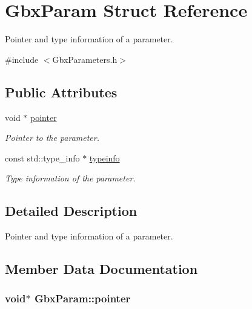 \hypertarget{structGbxParam}{\section{Gbx\-Param Struct Reference}
\label{structGbxParam}
}


Pointer and type information of a parameter.  




{\ttfamily \#include $<$Gbx\-Parameters.\-h$>$}

\subsection*{Public Attributes}
\begin{DoxyCompactItemize}
\item 
void $\ast$ \hyperlink{structGbxParam_a19b53f8dacdd8937e1020775f8615495}{pointer}
\begin{DoxyCompactList}\small\item\em Pointer to the parameter. \end{DoxyCompactList}\item 
const std\-::type\-\_\-info $\ast$ \hyperlink{structGbxParam_afb3596a5ba95fda1e27a5c6b4ed517b5}{typeinfo}
\begin{DoxyCompactList}\small\item\em Type information of the parameter. \end{DoxyCompactList}\end{DoxyCompactItemize}


\subsection{Detailed Description}
Pointer and type information of a parameter. 

\subsection{Member Data Documentation}
\hypertarget{structGbxParam_a19b53f8dacdd8937e1020775f8615495}{
\subsubsection[{pointer}]{\setlength{\rightskip}{0pt plus 5cm}void$\ast$ Gbx\-Param\-::pointer}}\label{structGbxParam_a19b53f8dacdd8937e1020775f8615495}


